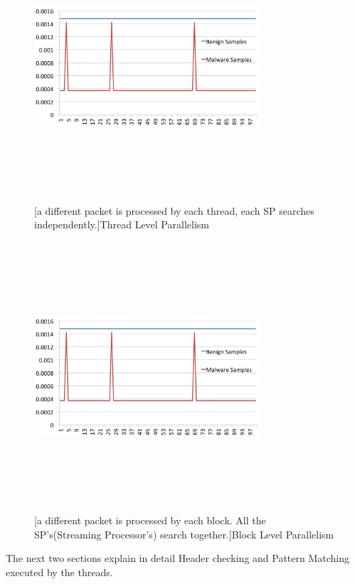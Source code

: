 \begin{figure}
	\centering
	\includegraphics[width=8.4cm, height=10cm]{500.png}
	\caption{[a different packet is processed by each thread, each SP searches independently.]Thread Level Parallelism}
	\label{fig:thread level}
\end{figure}

\begin{figure}
	\centering
	\includegraphics[width=8.4cm, height=10cm]{500.png}
	\caption{[a different packet is processed by each block. All the SP’s(Streaming Processor’s) search together.]Block Level Parallelism}
	\label{fig:block level}
\end{figure}

The next two sections explain in detail Header checking and Pattern Matching executed by the threads.

